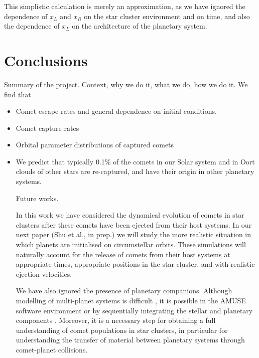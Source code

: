 \documentclass[usenatbib]{mn2e}
\begin{document}
This simplistic calculation is merely an approximation, as we have ignored the dependence of $x_L$ and $x_R$ on the star cluster environment and on time, and also the dependence of $x_L$ on the architecture of the planetary system.

\section{Conclusions}\label{section:conclusions}

Summary of the project. Context, why we do it, what we do, how we do it. We find that 
%
\begin{itemize}
\item Comet escape rates and general dependence on initial conditions.
\item Comet capture rates
\item Orbital parameter distributions of captured comets
\item We predict that typically 0.1\% of the comets in our Solar system and in Oort clouds of other stars are re-captured, and have their origin in other planetary systems.

Future works.


In this work we have considered the dynamical evolution of comets in star clusters after these comets have been ejected from their host systems. In our next paper (Shu et al., in prep.) we will study the more realistic situation in which planets are initialised on circumstellar orbits. These simulations will naturally account for the release of comets from their host systems at appropriate times, appropriate positions in the star cluster, and with realistic ejection velocities. 

We have also ignored the presence of planetary companions. Although modelling of multi-planet systems is difficult \citep[][]{Hao:2013aa, Shara:2016aa}, it is possible in the AMUSE software environment \citep[see][]{Portegies-Zwart:2013aa, Pelupessy:2013aa, Cai:2016aa} or by sequentially integrating the stellar and planetary components \citep[][]{Cai:2015aa}. Moreover, it is a necessary step for obtaining a full understanding of comet populations in star clusters, in particular for understanding the transfer of material between planetary systems through comet-planet collisions. 

\end{itemize}
\end{document}
